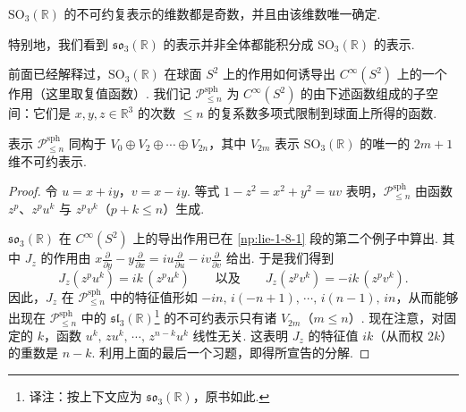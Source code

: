 \begin{corollary*}
$\mathrm{SO}_3(\mathbb R)$ 的不可约复表示的维数都是奇数，并且由该维数唯一确定.
\end{corollary*}

特别地，我们看到 $\mathfrak{so}_3(\mathbb R)$ 的表示并非全体都能积分成 $\mathrm{SO}_3(\mathbb R)$ 的表示.

\begin{numpara}\label{np:lie-1-13-4}
前面已经解释过，$\mathrm{SO}_3(\mathbb R)$ 在球面 $S^2$ 上的作用如何诱导出 $C^\infty(S^2)$ 上的一个作用（这里取复值函数）. 我们记 $\mathcal{P}^{\mathrm{sph}}_{\leqslant n}$ 为 $C^\infty(S^2)$ 的由下述函数组成的子空间：它们是 $x,y,z\in\mathbb R^3$ 的次数 $\leqslant n$ 的复系数多项式限制到球面上所得的函数.
\end{numpara}

\begin{proposition}\label{prop:lie-1-13-5}
表示 $\mathcal{P}^{\mathrm{sph}}_{\leqslant n}$ 同构于 $V_0\oplus V_2\oplus\cdots\oplus V_{2n}$，其中 $V_{2m}$ 表示 $\mathrm{SO}_3(\mathbb R)$ 的唯一的 $2m+1$ 维不可约表示.
\end{proposition}

\begin{proof}
令 $u=x+iy$，$v=x-iy$. 等式 $1-z^2=x^2+y^2=uv$ 表明，$\mathcal{P}^{\mathrm{sph}}_{\leqslant n}$ 由函数 $z^p$、$z^pu^k$ 与 $z^pv^k$（$p+k\leqslant n$）生成.

$\mathfrak{so}_3(\mathbb R)$ 在 $C^\infty(S^2)$ 上的导出作用已在 \ref{np:lie-1-8-1} 段的第二个例子中算出. 其中 $J_z$ 的作用由 $x\frac{\partial}{\partial y}-y\frac{\partial}{\partial x}=iu\frac{\partial}{\partial u}-iv\frac{\partial}{\partial v}$ 给出. 于是我们得到
\[
J_z(z^pu^k)=ik\,(z^pu^k)\qquad\text{以及}\qquad J_z(z^pv^k)=-ik\,(z^pv^k).
\]
因此，$J_z$ 在 $\mathcal{P}^{\mathrm{sph}}_{\leqslant n}$ 中的特征值形如 $-in,\,i(-n+1),\,\cdots,\,i(n-1),\,in$，从而能够出现在 $\mathcal{P}^{\mathrm{sph}}_{\leqslant n}$ 中的 $\mathfrak{sl}_3(\mathbb R)$\footnote{译注：按上下文应为 $\mathfrak{so}_3(\mathbb R)$，原书如此.} 的不可约表示只有诸 $V_{2m}$（$m\leqslant n$）. 现在注意，对固定的 $k$，函数 $u^k,\,zu^k,\,\cdots,\,z^{n-k}u^k$ 线性无关. 这表明 $J_z$ 的特征值 $ik$（从而权 $2k$）的重数是 $n-k$. 利用上面的最后一个习题，即得所宣告的分解.
\end{proof}

